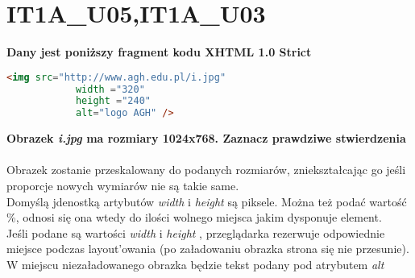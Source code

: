  \section{IT1A\_U05,IT1A\_U03}
 \textbf{Dany jest poniższy fragment kodu XHTML 1.0 Strict}
\vspace{0.4cm}
\noindent
\begin{lstlisting}[language=html]
	<img src="http://www.agh.edu.pl/i.jpg" 
			width ="320"
			height ="240" 
			alt="logo AGH" />
\end{lstlisting}
\textbf{Obrazek \textit{i.jpg} ma rozmiary 1024x768. Zaznacz prawdziwe stwierdzenia}
\\\\
Obrazek zostanie przeskalowany do podanych rozmiarów, zniekształcając go jeśli proporcje nowych wymiarów nie są takie same. \\
Domyślą jdenostką artybutów \textit{width} i \textit{height} są piksele. Można też podać wartość \%, odnosi się ona wtedy do ilości wolnego miejsca jakim dysponuje element.\\
Jeśli podane są wartości \textit{width} i \textit{height} , przeglądarka rezerwuje odpowiednie miejsce podczas layout'owania (po załadowaniu obrazka strona się nie przesunie).\\
W miejscu niezaładowanego obrazka będzie tekst podany pod atrybutem \textit{alt}